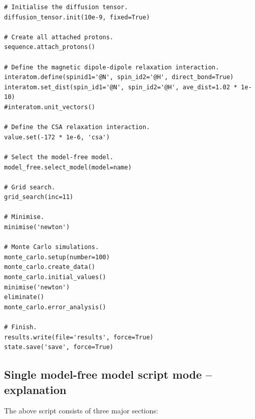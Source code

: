 \begin{htmlonly}
\begin{htmlonly}
\begin{lstlisting}
# Initialise the diffusion tensor.
diffusion_tensor.init(10e-9, fixed=True)

# Create all attached protons.
sequence.attach_protons()

# Define the magnetic dipole-dipole relaxation interaction.
interatom.define(spinid1='@N', spin_id2='@H', direct_bond=True)
interatom.set_dist(spin_id1='@N', spin_id2='@H', ave_dist=1.02 * 1e-10)
#interatom.unit_vectors()

# Define the CSA relaxation interaction.
value.set(-172 * 1e-6, 'csa')

# Select the model-free model.
model_free.select_model(model=name)

# Grid search.
grid_search(inc=11)

# Minimise.
minimise('newton')

# Monte Carlo simulations.
monte_carlo.setup(number=100)
monte_carlo.create_data()
monte_carlo.initial_values()
minimise('newton')
eliminate()
monte_carlo.error_analysis()

# Finish.
results.write(file='results', force=True)
state.save('save', force=True)
\end{lstlisting}



\subsection{Single model-free model script mode -- explanation}

The above script consists of three major sections:


\end{htmlonly}
\end{htmlonly}

